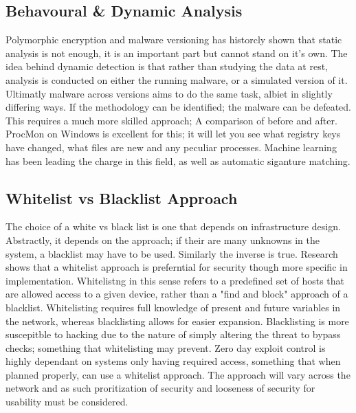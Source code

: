 
\subsection{Behavoural & Dynamic Analysis}
Polymorphic encryption and malware versioning has historcly shown that static analysis is not enough, it is an important part but cannot stand on it's own. The idea behind dynamic detection is that rather than
studying the data at rest, analysis is conducted on either the running malware, or a simulated version of it. Ultimatly malware across versions aims to do the same task, albiet in slightly differing ways. If the methodology
can be identified; the malware can be defeated. This requires a much more skilled approach; A comparison of before and after. ProcMon on Windows is excellent for this; it will let you see what registry keys have changed, what files are new and any peculiar processes.
Machine learning has been leading the charge in this field, as well as automatic siganture matching.


\subsection{Whitelist vs Blacklist Approach}
The choice of a white vs black list is one that depends on infrastructure design. Abstractly, it depends on the approach; if their are many unknowns in the system, a blacklist may have to be used. 
Similarly the inverse is true. Research shows that a whitelist approach is preferntial for security though more specific in implementation. Whitelistng in this sense refers to a predefined set of hosts
that are allowed access to a given device, rather than a "find and block" approach of a blacklist. Whitelisting requires full knowledge of present and future variables in the network, whereas blacklisting
allows for easier expansion. Blacklisting is more suscepitble to hacking due to the nature of simply altering the threat to bypass checks; something that whitelisting may prevent. Zero day exploit control is 
highly dependant on systems only having required access, something that when planned properly, can use a whitelist approach. The approach will vary across the network and as such proritization of security 
and looseness of security for usability must be considered.



